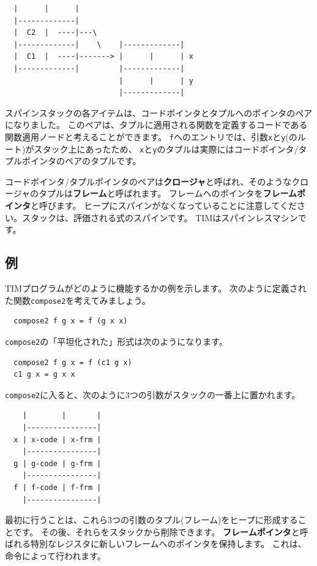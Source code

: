 \documentclass{jbook}
\begin{document}
\begin{verbatim}
  |      |      |
  |-------------|
  |  C2  |  ----|---\
  |-------------|    \    |-------------|
  |  C1  |  ----|-------> |      |      | x
  |-------------|         |-------------|
                          |      |      | y
                          |-------------|
\end{verbatim}

スパインスタックの各アイテムは、コードポインタとタプルへのポインタのペアになりました。
このペアは、タプルに適用される関数を定義するコードである関数適用ノードと考えることができます。
\texttt{f}へのエントリでは、引数\texttt{x}と\texttt{y}(のルート)がスタック上にあったため、
\texttt{x}と\texttt{y}のタプルは実際にはコードポインタ/タプルポインタのペアのタプルです。

コードポインタ/タプルポインタのペアは\textbf{クロージャ}と呼ばれ、そのようなクロージャのタプルは\textbf{フレーム}と呼ばれます。
フレームへのポインタを\textbf{フレームポインタ}と呼びます。
ヒープにスパインがなくなっていることに注意してください。スタックは、評価される式のスパインです。
TIMはスパインレスマシンです。

\subsection{例}

TIMプログラムがどのように機能するかの例を示します。
次のように定義された関数\texttt{compose2}を考えてみましょう。

\begin{verbatim}
  compose2 f g x = f (g x x)
\end{verbatim}

\texttt{compose2}の「平坦化された」形式は次のようになります。

\begin{verbatim}
  compose2 f g x = f (c1 g x)
  c1 g x = g x x
\end{verbatim}

\texttt{compose2}に入ると、次のように3つの引数がスタックの一番上に置かれます。

\begin{verbatim}
    |        |       |
    |----------------|
  x | x-code | x-frm |
    |----------------|
  g | g-code | g-frm |
    |----------------|
  f | f-code | f-frm |
    |----------------|
\end{verbatim}

最初に行うことは、これら3つの引数のタプル(フレーム)をヒープに形成することです。
その後、それらをスタックから削除できます。
\textbf{フレームポインタ}と呼ばれる特別なレジスタに新しいフレームへのポインタを保持します。
これは、命令によって行われます。
\end{document}
